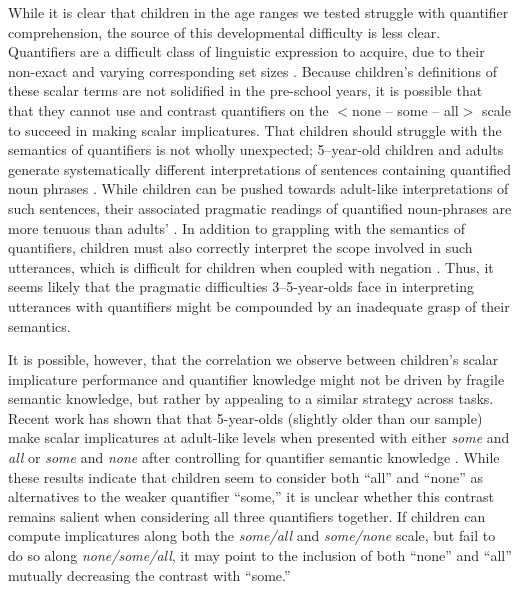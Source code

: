 \documentclass[man]{apa2}
\begin{document}
While it is clear that children in the age ranges we tested struggle with quantifier comprehension, the source of this developmental difficulty is less clear. Quantifiers are a difficult class of linguistic expression to acquire, due to their non-exact and varying corresponding set sizes \cite{hurewitz2006}. Because children's definitions of these scalar terms are not solidified in the pre-school years, it is possible that that they cannot use and contrast quantifiers on the $<${\sc none -- some -- all}$>$ scale to succeed in making scalar implicatures. That children should struggle with the semantics of quantifiers is not wholly unexpected; 5--year-old children and adults generate systematically different interpretations of sentences containing quantified noun phrases \cite{musolino1998}. While children can be pushed towards adult-like interpretations of such sentences, their associated pragmatic readings of quantified noun-phrases are more tenuous than adults' \cite{musolino2006}. In addition to grappling with the semantics of quantifiers, children must also correctly interpret the scope involved in such utterances, which is difficult for children when coupled with negation \cite{musolino2006,zhou2009}. Thus, it seems likely that the pragmatic difficulties 3--5-year-olds face in interpreting utterances with quantifiers might be compounded by an inadequate grasp of their semantics.

It is possible, however, that the correlation we observe between children's scalar implicature performance and quantifier knowledge might not be driven by fragile semantic knowledge, but rather by appealing to a similar strategy across tasks. Recent work has shown that that 5-year-olds (slightly older than our sample) make scalar implicatures at adult-like levels when presented with either \emph{some} and \emph{all} or \emph{some} and \emph{none} after controlling for quantifier semantic knowledge \cite{skordos2016}. While these results indicate that children seem to consider both ``all'' and ``none'' as alternatives to the weaker quantifier ``some,'' it is unclear whether this contrast remains salient when considering all three quantifiers together. If children can compute implicatures along both the \emph{some/all} and \emph{some/none} scale, but fail to do so along \emph{none/some/all}, it may point to the inclusion of both ``none'' and ``all'' mutually decreasing the contrast with ``some.''
\end{document}
